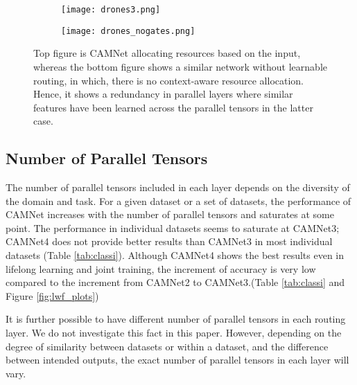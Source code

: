 \documentclass[10pt,twocolumn,letterpaper]{article}
\begin{document}
\begin{figure}[ht]
	\begin{center}
		\begin{subfigure}[b]{\columnwidth}
			\texttt{[image: drones3.png]}
		\end{subfigure}
		\begin{subfigure}[b]{\columnwidth}
			\texttt{[image: drones\_nogates.png]}
		\end{subfigure}
	\end{center}
	\vspace{-0.2in}
	\caption{Top figure is CAMNet allocating resources based on the input, whereas the bottom figure shows a similar network without learnable routing, in which, there is no context-aware resource allocation. Hence, it shows a redundancy in parallel layers where similar features have been learned across the parallel tensors in the latter case.}
	\label{fig:withandwithout_routing}
	\vspace{-0.1in}
\end{figure}

\subsection{Number of Parallel Tensors}
\label{ss:parallel_tensors}
\vspace{-0.05in}
The number of parallel tensors included in each layer depends on the diversity of the domain and task. For a given dataset or a set of datasets, the performance of CAMNet increases with the number of parallel tensors and saturates at some point. The performance in individual datasets seems to saturate at CAMNet3; CAMNet4 does not provide better results than CAMNet3 in most individual datasets (Table \ref{tab:classi}). Although CAMNet4 shows the best results even in lifelong learning and joint training, the increment of accuracy is very low compared to the increment from CAMNet2 to CAMNet3.(Table \ref{tab:classi} and Figure \ref{fig:lwf_plots})

It is further possible to have different number of parallel tensors in each routing layer. We do not investigate this fact in this paper. However, depending on the degree of similarity between datasets or within a dataset, and the difference between intended outputs, the exact number of parallel tensors in each layer will vary.
\end{document}
